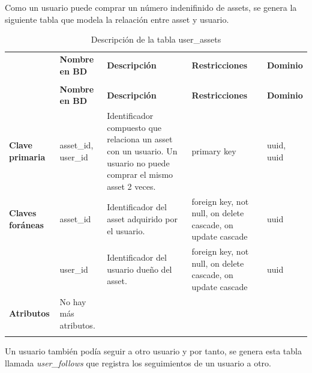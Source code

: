 Como un usuario puede comprar un número indenifinido de assets, se genera la siguiente tabla que modela la relaación entre asset y usuario.

\renewcommand{\arraystretch}{1.35}
\setlength{\tabcolsep}{3pt}
\small

\begin{longtable}{|
>{\raggedright\arraybackslash}p{1.9cm}|
>{\raggedright\arraybackslash}p{2.7cm}|
>{\raggedright\arraybackslash}p{4.9cm}|
>{\raggedright\arraybackslash}p{2.7cm}|
>{\raggedright\arraybackslash}p{2.1cm}|
}
\hline

\rowcolor[gray]{0.75}
\multicolumn{5}{|c|}{\textbf{Assets de usuarios}} \\
\hline

 & \textbf{Nombre en BD} & \textbf{Descripción} & \textbf{Restricciones} & \textbf{Dominio} \\
\hline
\endfirsthead

\hline
\rowcolor[gray]{0.75}
\multicolumn{5}{|c|}{\textbf{Assets de usuarios}} \\
\hline

 & \textbf{Nombre en BD} & \textbf{Descripción} & \textbf{Restricciones} & \textbf{Dominio} \\
\hline
\endhead

\textbf{Clave primaria}
& asset\_\allowbreak id, user\_\allowbreak id
& Identificador compuesto que relaciona un asset con un usuario. Un usuario no puede comprar el mismo asset 2 veces. 
& primary key
& uuid, uuid \\
\hline

\textbf{Claves foráneas}
& asset\_\allowbreak id
& Identificador del asset adquirido por el usuario.
& foreign key, not null, on delete cascade, on update cascade
& uuid \\
\cline{2-5}

& user\_\allowbreak id
& Identificador del usuario dueño del asset.
& foreign key, not null, on delete cascade, on update cascade
& uuid \\
\hline

\textbf{Atributos}
& No hay más atributos.
& 
& 
& \\
\hline

\caption{Descripción de la tabla user\_assets}

\end{longtable}



Un usuario también podía seguir a otro usuario y por tanto, se genera esta tabla llamada \textit{user\_follows} que registra los seguimientos de un usuario a otro.

